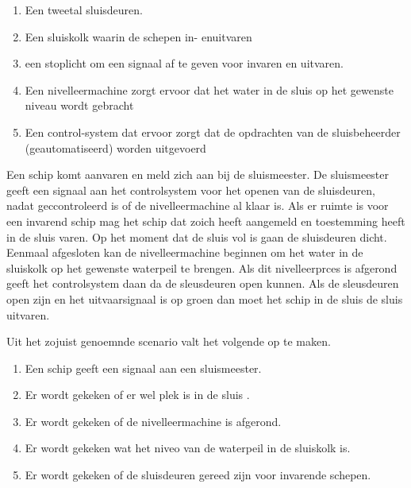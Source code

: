 \begin{enumerate}
\item Een tweetal sluisdeuren. 
\item Een sluiskolk waarin de schepen in- enuitvaren
\item een stoplicht om een signaal af te geven voor invaren en uitvaren.
\item Een nivelleermachine zorgt ervoor dat het water in de sluis op het gewenste niveau wordt gebracht
\item Een control-system dat ervoor zorgt dat de opdrachten van de sluisbeheerder (geautomatiseerd) worden uitgevoerd
\end{enumerate}

Een schip komt aanvaren en meld zich aan bij de sluismeester. De sluismeester geeft een signaal aan het controlsystem voor het openen van de sluisdeuren, nadat geccontroleerd is of de nivelleermachine al klaar is. Als er ruimte is voor een invarend schip mag het schip dat zoich heeft aangemeld en toestemming heeft  in de sluis varen. Op het moment dat de sluis vol is gaan de sluisdeuren dicht. Eenmaal afgesloten kan de nivelleermachine beginnen om het water in de sluiskolk op het gewenste waterpeil te brengen. Als dit nivelleerprces is afgerond geeft  het controlsystem daan da de sleusdeuren open kunnen.  Als de sleusdeuren open zijn en het uitvaarsignaal is op groen dan moet het schip in de sluis de sluis uitvaren.

Uit het zojuist genoemnde scenario valt het volgende op te maken.
\begin{enumerate}
\item Een schip geeft een signaal aan een sluismeester.
\item Er wordt gekeken of er wel plek is in de sluis .
\item Er wordt gekeken of de nivelleermachine is afgerond.
\item Er wordt gekeken wat het niveo van de waterpeil in de sluiskolk is.
\item Er wordt gekeken of de sluisdeuren gereed zijn voor invarende schepen.
\end{enumerate}







